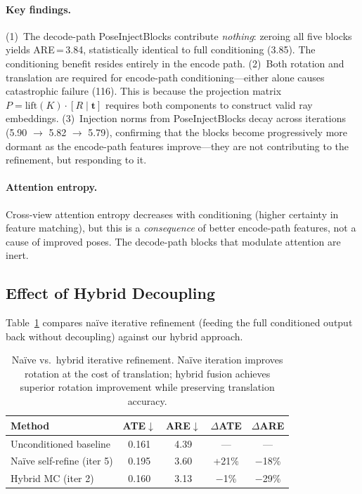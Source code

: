 \paragraph{Key findings.} (1)~The decode-path PoseInjectBlocks contribute \emph{nothing}: zeroing all five blocks yields ARE\,=\,3.84\degree{}, statistically identical to full conditioning (3.85\degree{}). The conditioning benefit resides entirely in the encode path. (2)~Both rotation and translation are required for encode-path conditioning---either alone causes catastrophic failure (116\degree{}). This is because the projection matrix $P = \text{lift}(K) \cdot [R \mid \mathbf{t}]$ requires both components to construct valid ray embeddings. (3)~Injection norms from PoseInjectBlocks decay across iterations (5.90 $\rightarrow$ 5.82 $\rightarrow$ 5.79), confirming that the blocks become progressively more dormant as the encode-path features improve---they are not contributing to the refinement, but responding to it.

\paragraph{Attention entropy.} Cross-view attention entropy decreases with conditioning (higher certainty in feature matching), but this is a \emph{consequence} of better encode-path features, not a cause of improved poses. The decode-path blocks that modulate attention are inert.

\subsection{Effect of Hybrid Decoupling}

Table~\ref{tab:naive_vs_hybrid} compares na\"ive iterative refinement (feeding the full conditioned output back without decoupling) against our hybrid approach.

\begin{table}[h]
\centering
\caption{Na\"ive vs.\ hybrid iterative refinement. Na\"ive iteration improves rotation at the cost of translation; hybrid fusion achieves superior rotation improvement while preserving translation accuracy.}
\label{tab:naive_vs_hybrid}
\begin{tabular}{@{}lcccc@{}}
\toprule
Method & ATE$\downarrow$ & ARE$\downarrow$ & $\Delta$ATE & $\Delta$ARE \\
\midrule
Unconditioned baseline & 0.161 & 4.39\degree{} & --- & --- \\
Na\"ive self-refine (iter 5) & 0.195 & 3.60\degree{} & +21\% & $-$18\% \\
Hybrid MC (iter 2) & 0.160 & 3.13\degree{} & $-$1\% & $-$29\% \\
\bottomrule
\end{tabular}
\end{table}

